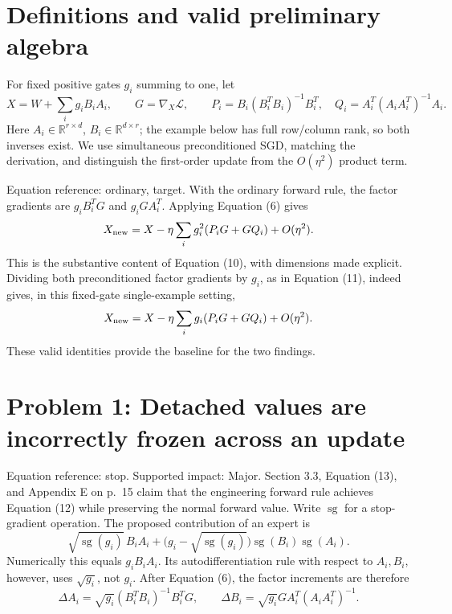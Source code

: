 \documentclass[10pt]{article}
\begin{document}
\section*{Definitions and valid preliminary algebra}
For fixed positive gates \(g_i\) summing to one, let \[X=W+\sum_i g_iB_iA_i,\qquad G=\nabla_X\mathcal L,\qquad
 P_i=B_i(B_i^TB_i)^{-1}B_i^T,\quad
 Q_i=A_i^T(A_iA_i^T)^{-1}A_i.\] Here \(A_i\in\mathbb R^{r\times d}\), \(B_i\in\mathbb R^{d\times r}\); the example below has full row/column rank, so both inverses exist. We use simultaneous preconditioned SGD, matching the derivation, and distinguish the first-order update from the \(O(\eta^2)\) product term.\par
Equation reference: ordinary, target. With the ordinary forward rule, the factor gradients are \(g_iB_i^TG\) and \(g_iGA_i^T\). Applying Equation (6) gives \[
 X_{\rm new}=X-\eta\sum_i g_i^2(P_iG+GQ_i)+O(\eta^2).\] This is the substantive content of Equation (10), with dimensions made explicit. Dividing both preconditioned factor gradients by \(g_i\), as in Equation (11), indeed gives, in this fixed-gate single-example setting, \[
 X_{\rm new}=X-\eta\sum_i g_i(P_iG+GQ_i)+O(\eta^2).\] These valid identities provide the baseline for the two findings.\par
\section*{Problem 1: Detached values are incorrectly frozen across an update}
Equation reference: stop. Supported impact: Major. Section 3.3, Equation (13), and Appendix E on p. 15 claim that the engineering forward rule achieves Equation (12) while preserving the normal forward value. Write \(\operatorname{sg}\) for a stop-gradient operation. The proposed contribution of an expert is \[
 \sqrt{\operatorname{sg}(g_i)}\,B_iA_i+
 \bigl(g_i-\sqrt{\operatorname{sg}(g_i)}\bigr)
          \operatorname{sg}(B_i)\operatorname{sg}(A_i).\] Numerically this equals \(g_iB_iA_i\). Its autodifferentiation rule with respect to \(A_i,B_i\), however, uses \(\sqrt{g_i}\), not \(g_i\). After Equation (6), the factor increments are therefore \[\Delta A_i=\sqrt{g_i}(B_i^TB_i)^{-1}B_i^TG,\qquad
 \Delta B_i=\sqrt{g_i}GA_i^T(A_iA_i^T)^{-1}.\]\par
\end{document}
